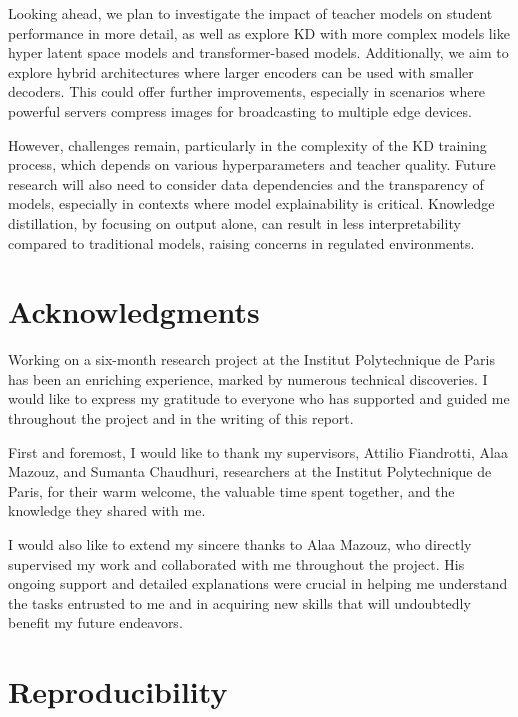 \documentclass{article}
\begin{document}
Looking ahead, we plan to investigate the impact of teacher models on student performance in more detail, as well as explore KD with more complex models like hyper latent space models and transformer-based models. Additionally, we aim to explore hybrid architectures where larger encoders can be used with smaller decoders. This could offer further improvements, especially in scenarios where powerful servers compress images for broadcasting to multiple edge devices.

However, challenges remain, particularly in the complexity of the KD training process, which depends on various hyperparameters and teacher quality. Future research will also need to consider data dependencies and the transparency of models, especially in contexts where model explainability is critical. Knowledge distillation, by focusing on output alone, can result in less interpretability compared to traditional models, raising concerns in regulated environments.

\section*{Acknowledgments}
Working on a six-month research project at the Institut Polytechnique de Paris has been an enriching experience, marked by numerous technical discoveries. I would like to express my gratitude to everyone who has supported and guided me throughout the project and in the writing of this report.

First and foremost, I would like to thank my supervisors, Attilio Fiandrotti, Alaa Mazouz, and Sumanta Chaudhuri, researchers at the Institut Polytechnique de Paris, for their warm welcome, the valuable time spent together, and the knowledge they shared with me.

I would also like to extend my sincere thanks to Alaa Mazouz, who directly supervised my work and collaborated with me throughout the project. His ongoing support and detailed explanations were crucial in helping me understand the tasks entrusted to me and in acquiring new skills that will undoubtedly benefit my future endeavors.

\printbibliography

\appendix

\section{Reproducibility}
\end{document}
